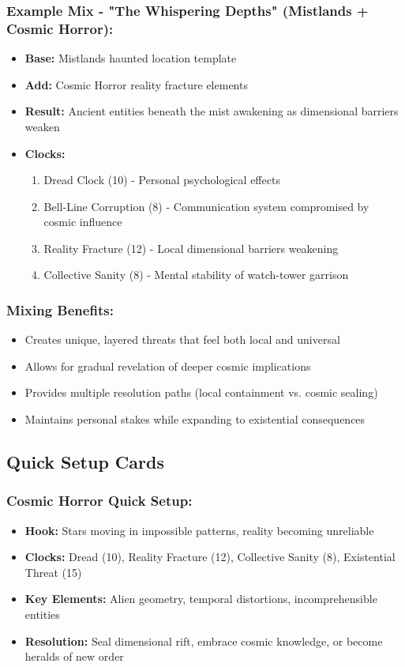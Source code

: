 \documentclass[11pt]{article}
\begin{document}
\subsubsection{Example Mix - "The Whispering Depths" (Mistlands + Cosmic Horror):}
\begin{itemize}
\item \textbf{Base:} Mistlands haunted location template
\item \textbf{Add:} Cosmic Horror reality fracture elements
\item \textbf{Result:} Ancient entities beneath the mist awakening as dimensional barriers weaken
\item \textbf{Clocks:}
  \begin{enumerate}
  \item Dread Clock (10) - Personal psychological effects
  \item Bell-Line Corruption (8) - Communication system compromised by cosmic influence
  \item Reality Fracture (12) - Local dimensional barriers weakening
  \item Collective Sanity (8) - Mental stability of watch-tower garrison
  \end{enumerate}
\end{itemize}

\subsubsection{Mixing Benefits:}
\begin{itemize}
\item Creates unique, layered threats that feel both local and universal
\item Allows for gradual revelation of deeper cosmic implications
\item Provides multiple resolution paths (local containment vs. cosmic sealing)
\item Maintains personal stakes while expanding to existential consequences
\end{itemize}

\subsection{Quick Setup Cards}

\subsubsection{Cosmic Horror Quick Setup:}
\begin{itemize}
\item \textbf{Hook:} Stars moving in impossible patterns, reality becoming unreliable
\item \textbf{Clocks:} Dread (10), Reality Fracture (12), Collective Sanity (8), Existential Threat (15)
\item \textbf{Key Elements:} Alien geometry, temporal distortions, incomprehensible entities
\item \textbf{Resolution:} Seal dimensional rift, embrace cosmic knowledge, or become heralds of new order
\end{itemize}
\end{document}
